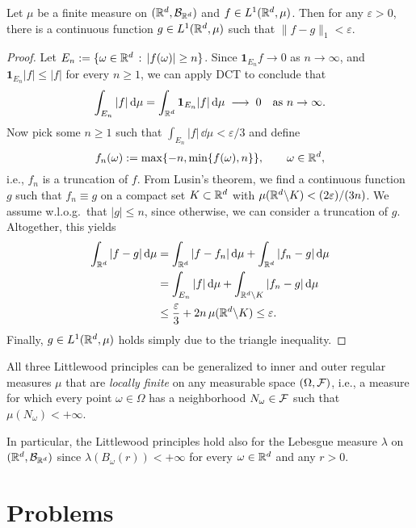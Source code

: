 \begin{theorem}[Approximation in $L^1$]
	Let $\mu$ be a finite measure on $(\mathbb R^d,\mathcal B_{\mathbb R^d})$ and $f\in L^1(\mathbb R^d,\mu)$. Then for any $\varepsilon>0$, there is a continuous function $g\in L^1(\mathbb R^d,\mu)$ such that $\|f-g\|_1<\varepsilon$.
\end{theorem}
\begin{proof}
	Let $E_n:=\{\omega\in\mathbb R^d\,:\, |f(\omega)|\ge n\}$. Since $\mathbf{1}_{E_n}f \to 0$ as $n\to\infty$, and $\mathbf{1}_{E_n}|f|\le |f|$ for every $n\ge 1$, we can apply DCT to conclude that
	\[
		\int_{E_n} |f|\,\mathrm{d}\mu = \int_{\mathbb R^d} \mathbf{1}_{E_n}|f|\,\mathrm{d}\mu\;\longrightarrow\;0\quad\text{as $n\to\infty$}.
	\]
	Now pick some $n\ge 1$ such that $\int_{E_n} |f|\,\dd\mu <\varepsilon/3$ and define
	\[
		f_n(\omega):= \max\{-n,\min\{f(\omega),n\}\}, \qquad\omega\in\mathbb R^d,
	\]
	i.e., $f_n$ is a truncation of $f$. From Lusin's theorem, we find a continuous function $g$ such that $f_n\equiv g$ on a compact set $K\subset\mathbb R^d$ with $\mu(\mathbb R^d\backslash K)<(2\varepsilon)/(3n)$. We assume w.l.o.g.\ that $|g|\le n$, since otherwise, we can consider a truncation of $g$. Altogether, this yields
	\begin{align*}
		\int_{\mathbb R^d} |f-g|\,\mathrm{d}\mu &= \int_{\mathbb R^d} |f-f_n|\,\mathrm{d}\mu + \int_{\mathbb R^d} |f_n-g|\,\mathrm{d}\mu \\
		&= \int_{E_n} |f|\,\mathrm{d}\mu + \int_{\mathbb R^d\backslash K} |f_n-g|\,\mathrm{d}\mu \\
		&\le \frac{\varepsilon}{3} + 2n\,\mu(\mathbb R^d\backslash K) \le  \varepsilon.
	\end{align*}
	Finally, $g\in L^1(\mathbb R^d,\mu)$ holds simply due to the triangle inequality.
\end{proof}


\begin{remark}
	All three Littlewood principles can be generalized to inner and outer regular measures $\mu$ that are \emph{locally finite} on any measurable space $(\Omega,\mathcal F)$, i.e., a measure for which every point $\omega\in\Omega$ has a neighborhood $N_\omega\in\mathcal F$ such that $\mu(N_\omega)<+\infty$. 
	
	In particular, the Littlewood principles hold also for the Lebesgue measure $\lambda$ on $(\mathbb R^d,\mathcal B_{\mathbb R^d})$ since $\lambda(B_\omega(r))<+\infty$ for every $\omega\in\mathbb R^d$ and any $r>0$.
\end{remark}

\section{Problems}


	
